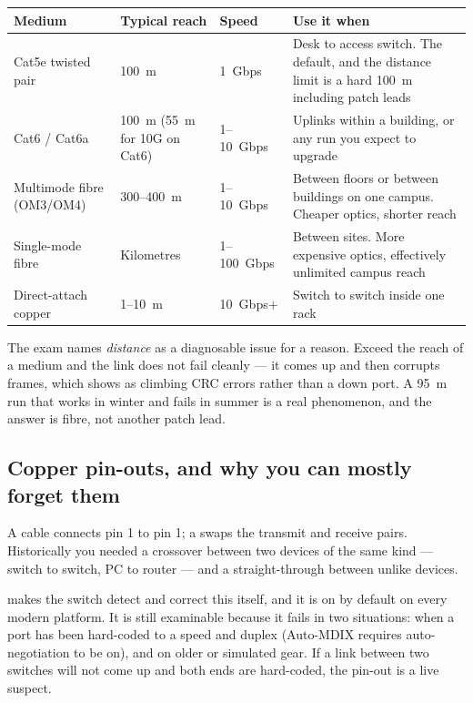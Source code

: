 \begin{longtable}{@{}L{3.1cm}L{2.4cm}L{2.6cm}L{6.8cm}@{}}
\toprule
{}
\textbf{Medium} & \textbf{Typical reach} & \textbf{Speed} & \textbf{Use it when} \\
\midrule
\endhead
Cat5e twisted pair & 100~m & 1~Gbps & Desk to access switch. The default, and
the distance limit is a hard 100~m including patch leads \\
Cat6 / Cat6a & 100~m (55~m for 10G on Cat6) & 1--10~Gbps & Uplinks within a
building, or any run you expect to upgrade \\
Multimode fibre (OM3/OM4) & 300--400~m & 1--10~Gbps & Between floors or between
buildings on one campus. Cheaper optics, shorter reach \\
Single-mode fibre & Kilometres & 1--100~Gbps & Between sites. More expensive
optics, effectively unlimited campus reach \\
Direct-attach copper & 1--10~m & 10~Gbps+ & Switch to switch inside one rack \\
\bottomrule
\end{longtable}

\begin{conceptbox}
The exam names \emph{distance} as a diagnosable issue for a reason. Exceed the
reach of a medium and the link does not fail cleanly --- it comes up and then
corrupts frames, which shows as climbing CRC errors rather than a down port. A
95~m run that works in winter and fails in summer is a real phenomenon, and the
answer is fibre, not another patch lead.
\end{conceptbox}

\subsection{Copper pin-outs, and why you can mostly forget them}

A  cable connects pin 1 to pin 1; a 
swaps the transmit and receive pairs. Historically you needed a crossover between
two devices of the same kind --- switch to switch, PC to router --- and a
straight-through between unlike devices.

 makes the switch detect and correct this itself, and it is on by
default on every modern platform. It is still examinable because it fails in two
situations: when a port has been hard-coded to a speed and duplex (Auto-MDIX
requires auto-negotiation to be on), and on older or simulated gear. If a link
between two switches will not come up and both ends are hard-coded, the pin-out
is a live suspect.

